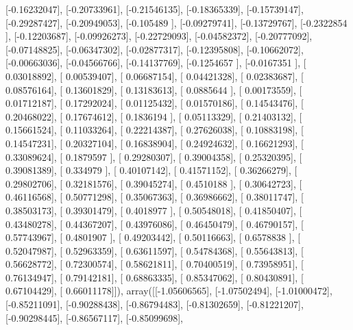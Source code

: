 \documentclass{article}
\begin{document}
       [-0.16232047],
       [-0.20733961],
       [-0.21546135],
       [-0.18365339],
       [-0.15739147],
       [-0.29287427],
       [-0.20949053],
       [-0.105489  ],
       [-0.09279741],
       [-0.13729767],
       [-0.2322854 ],
       [-0.12203687],
       [-0.09926273],
       [-0.22729093],
       [-0.04582372],
       [-0.20777092],
       [-0.07148825],
       [-0.06347302],
       [-0.02877317],
       [-0.12395808],
       [-0.10662072],
       [-0.00663036],
       [-0.04566766],
       [-0.14137769],
       [-0.1254657 ],
       [-0.0167351 ],
       [ 0.03018892],
       [ 0.00539407],
       [ 0.06687154],
       [ 0.04421328],
       [ 0.02383687],
       [ 0.08576164],
       [ 0.13601829],
       [ 0.13183613],
       [ 0.0885644 ],
       [ 0.00173559],
       [ 0.01712187],
       [ 0.17292024],
       [ 0.01125432],
       [ 0.01570186],
       [ 0.14543476],
       [ 0.20468022],
       [ 0.17674612],
       [ 0.1836194 ],
       [ 0.05113329],
       [ 0.21403132],
       [ 0.15661524],
       [ 0.11033264],
       [ 0.22214387],
       [ 0.27626038],
       [ 0.10883198],
       [ 0.14547231],
       [ 0.20327104],
       [ 0.16838904],
       [ 0.24924632],
       [ 0.16621293],
       [ 0.33089624],
       [ 0.1879597 ],
       [ 0.29280307],
       [ 0.39004358],
       [ 0.25320395],
       [ 0.39081389],
       [ 0.334979  ],
       [ 0.40107142],
       [ 0.41571152],
       [ 0.36266279],
       [ 0.29802706],
       [ 0.32181576],
       [ 0.39045274],
       [ 0.4510188 ],
       [ 0.30642723],
       [ 0.46116568],
       [ 0.50771298],
       [ 0.35067363],
       [ 0.36986662],
       [ 0.38011747],
       [ 0.38503173],
       [ 0.39301479],
       [ 0.4018977 ],
       [ 0.50548018],
       [ 0.41850407],
       [ 0.43480278],
       [ 0.44367207],
       [ 0.43976086],
       [ 0.46450479],
       [ 0.46790157],
       [ 0.57743967],
       [ 0.4801907 ],
       [ 0.49203442],
       [ 0.50116663],
       [ 0.6578838 ],
       [ 0.52047987],
       [ 0.52963359],
       [ 0.63611597],
       [ 0.54784368],
       [ 0.55643813],
       [ 0.56628772],
       [ 0.72300574],
       [ 0.58621811],
       [ 0.70400519],
       [ 0.73958951],
       [ 0.76134947],
       [ 0.79142181],
       [ 0.68863335],
       [ 0.85347062],
       [ 0.80430891],
       [ 0.67104429],
       [ 0.66011178]]), array([[-1.05606565],
       [-1.07502494],
       [-1.01000472],
       [-0.85211091],
       [-0.90288438],
       [-0.86794483],
       [-0.81302659],
       [-0.81221207],
       [-0.90298445],
       [-0.86567117],
       [-0.85099698],
\end{document}
